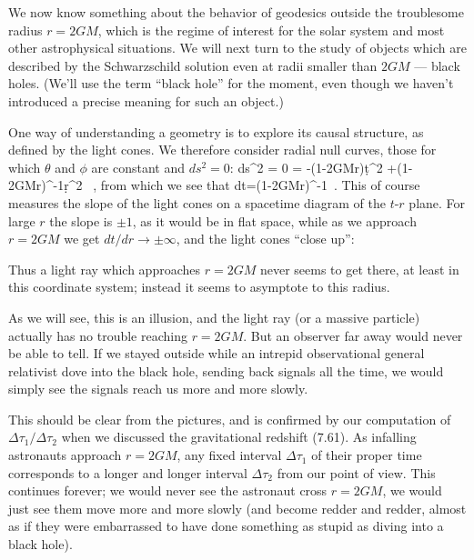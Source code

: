 We now know something about the behavior of geodesics outside the 
troublesome radius $r=2GM$, which is the regime of interest for the
solar system and most other astrophysical situations.  We will next turn 
to the study of objects which are described by the Schwarzschild solution
even at radii smaller than $2GM$ --- black holes.  (We'll use the
term ``black hole'' for the moment, even though we haven't introduced
a precise meaning for such an object.)

One way of understanding a geometry is to explore its causal structure,
as defined by the light cones.  We therefore consider radial null curves, 
those for which $\theta$ and $\phi$ are constant and $ds^2=0$:
\be
  ds^2 = 0 = -\left(1-{{2GM}\over r}\right)\d t^2 
  +\left(1-{{2GM}\over r}\right)^{-1}\d r^2 \ ,\label{7.63}
\ee
from which we see that
\be
  {{dt}}=\pm \left(1-{{2GM}\over r}\right)^{-1}\ .\label{7.64}
\ee
This of course measures the slope of the light cones on a spacetime diagram
of the $t$-$r$ plane.  For large $r$ the slope is $\pm 1$, as it would
be in flat space, while as we approach $r=2GM$  we get $dt/dr\rightarrow
\pm\infty$, and the light cones ``close up'':

\begin{figure}[h]
  \centerline{
  }
\end{figure}

\noindent Thus a light ray which approaches $r=2GM$ never seems to
get there, at least in this coordinate system; instead it seems to
asymptote to this radius.

As we will see, this is an illusion, and the light ray (or a massive
particle) actually has no trouble reaching $r=2GM$.  But an observer
far away would never be able to tell.  If we stayed outside while
an intrepid observational general relativist dove into the black
hole, sending back signals all the time, we would simply see the
signals reach us more and more slowly.
\begin{figure}
  \centerline{
  }
\end{figure}
This should be clear from the pictures, and is confirmed
by our computation of $\Delta\tau_1/\Delta\tau_2$ when we discussed
the gravitational redshift (7.61).  As infalling astronauts
approach $r=2GM$, any fixed interval $\Delta\tau_1$ of their proper
time corresponds to a longer and longer interval $\Delta\tau_2$
from our point of view.  This continues forever; we would never see
the astronaut cross $r=2GM$, we would just see them move more and 
more slowly (and become redder and redder, almost as if they were
embarrassed to have done something as stupid as diving into a black
hole).


